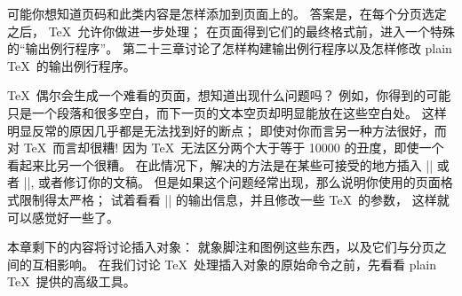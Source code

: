 \danger \1可能你想知道页码和此类内容是怎样添加到页面上的。%
答案是，在每个分页选定之后， \TeX\ 允许你做进一步处理；
在页面得到它们的最终格式前，进入一个特殊的``输出例行程序''。%
第二十三章讨论了怎样构建输出例行程序以及怎样修改 plain \TeX\ 的输出例行程序。

\danger  \TeX\ 偶尔会生成一个难看的页面，想知道出现什么问题吗？
例如，你得到的可能只是一个段落和很多空白，而下一页的文本空页却明显能放在这些空白处。%
这样明显反常的原因几乎都是无法找到好的断点；
即使对你而言另一种方法很好，而对 \TeX\ 而言却很糟!
因为 \TeX\ 无法区分两个大于等于 10000 的丑度，即使一个看起来比另一个很糟。%
在此情况下，解决的方法是在某些可接受的地方插入 |\eject| 或者 |\vfill\eject|,
或者修订你的文稿。%
但是如果这个问题经常出现，那么说明你使用的页面格式限制得太严格；
试着看看 |\tracingpages| 的输出信息，并且修改一些 \TeX\ 的参数，
这样就可以感觉好一些了。

\danger 本章剩下的内容将讨论插入对象：
就象脚注和图例这些东西，以及它们与分页之间的互相影响。%
在我们讨论 \TeX\ 处理插入对象的原始命令之前，先看看 plain \TeX\ 提供的高级工具。

